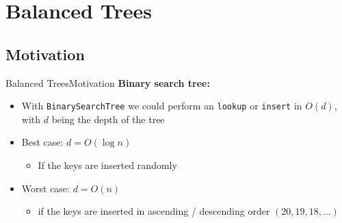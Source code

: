 \section{Balanced Trees}

\subsection{Motivation}

\begin{frame}{Balanced Trees}{Motivation}
  \textbf{Binary search tree:}
  \begin{itemize}
  \item<2->
    With \texttt{\color{Mittel-Blau}BinarySearchTree} we could perform an
    \texttt{\color{Mittel-Blau}lookup} or
    \texttt{\color{Mittel-Blau}insert} in {\color{Mittel-Blau}$O(d)$}, with {\color{Mittel-Blau}$d$} being
    the {\color{Mittel-Blau}depth} of the tree
  \item<3->
    Best case: {\color{Mittel-Blau}$d = O(\log n)$}
    \begin{itemize}
    \item<4-> If the keys are inserted randomly
    \end{itemize}   
  \item<5->
    Worst case: {\color{Mittel-Blau}$d = O(n)$}
    \begin{itemize}
    \item<6->if the keys are inserted in ascending / descending
      order {\color{Mittel-Blau}$(20, 19, 18, \dotsc)$}
    \end{itemize}  
  \end{itemize}
\end{frame}


